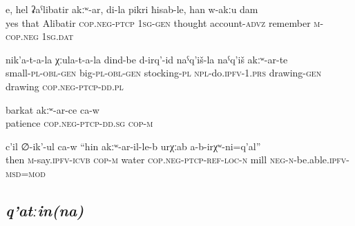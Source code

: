 \begin{exe}
	\ex
	\begin{xlist}
		\ex	\label{Yes, except Alibatir, in my mind, I do not remember}
		\gll	e,	hel	ʡaˁlibatir	akːʷ-ar,	di-la	pikri	ħisab-le,	han	w-akːu	dam   \\
			yes	that	Alibatir	\textsc{cop.neg}-\textsc{ptcp}	1\textsc{sg}-\textsc{gen}	thought	account-\textsc{advz}	remember	\textsc{m}-\textsc{cop.neg}	1\textsc{sg.}\textsc{dat}\\
		\glt	{}

		\ex	\label{For children, for adults we make stockings, those with a drawing, those without a drawing}
		\gll	nik'a-t-a-la	χːula-t-a-la	dind-be	d-irq'-id	naˁq'iš-la	naˁq'iš	akːʷ-ar-te \\
			small-\textsc{pl}-\textsc{obl}-\textsc{gen}	big-\textsc{pl}-\textsc{obl}-\textsc{gen}	stocking-\textsc{pl}	\textsc{npl}-do.\textsc{ipfv}-1.\textsc{prs}	drawing-\textsc{gen} drawing	\textsc{cop.neg}-\textsc{ptcp}-\textsc{dd.pl }\\
		\glt	{}

		\ex	\label{(He) lacks patience}
		\gll	barkat	akːʷ-ar-ce	ca-w  \\
			patience	\textsc{cop.neg}-\textsc{ptcp}-\textsc{dd}.\textsc{sg}	\textsc{cop-m}\\
		\glt	{}

		\ex	\label{‎‎He said, there where is no water a mill cannot be}
		\gll	c'il	∅-ik'-ul ca-w		``hin	akːʷ-ar-il-le-b	urχːab	a-b-irχʷ-ni=q'al''  \\
			then	\textsc{m}-say.\textsc{ipfv}-\textsc{icvb} \textsc{cop-m} water \textsc{cop.neg}-\textsc{ptcp}-\textsc{ref}-\textsc{loc}-\textsc{n}	mill	\textsc{neg}-\textsc{n}-be.able.\textsc{ipfv}-\textsc{msd}=\textsc{mod}\\
		\glt	{}
	\end{xlist}
\end{exe}



\subsection{\textit{q'atːin(na)} }
\label{ssec:postposition qatinna}

